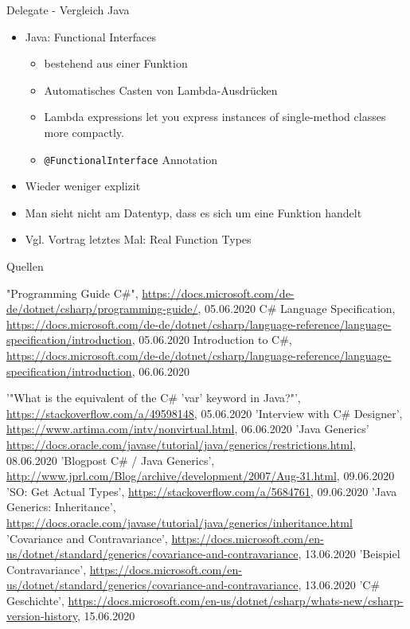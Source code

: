 \documentclass[11pt]{beamer}
\begin{document}
\begin{frame}{Delegate - Vergleich Java}
	\begin{itemize}
		\item Java: Functional Interfaces
		\begin{itemize}
			\item bestehend aus einer Funktion
			\item Automatisches Casten von Lambda-Ausdrücken
			\item \glqq Lambda expressions let you express instances of single-method classes more compactly.\grqq
			\item \texttt{@FunctionalInterface} Annotation		
		\end{itemize}
		\item Wieder weniger explizit
		\item Man sieht nicht am Datentyp, dass es sich um eine Funktion handelt
		\item Vgl. Vortrag letztes Mal: \glqq Real Function Types\grqq
	\end{itemize}
\end{frame}


\begin{frame}{Quellen}
\begin{thebibliography}{99}
\fontsize{6pt}{7.2}\selectfont
	"Programming Guide C\#", \url{https://docs.microsoft.com/de-de/dotnet/csharp/programming-guide/}, 05.06.2020
	 C\# Language Specification, \url{https://docs.microsoft.com/de-de/dotnet/csharp/language-reference/language-specification/introduction}, 05.06.2020
   Introduction to C\#, \url{https://docs.microsoft.com/de-de/dotnet/csharp/language-reference/language-specification/introduction}, 06.06.2020

 '"What is the equivalent of the C\# 'var' keyword in Java?"', 
 \url{https://stackoverflow.com/a/49598148}, 05.06.2020
 'Interview with C\# Designer', \url{https://www.artima.com/intv/nonvirtual.html}, 06.06.2020
  'Java Generics' \url{https://docs.oracle.com/javase/tutorial/java/generics/restrictions.html}, 08.06.2020
  'Blogpost C\# / Java Generics', \url{http://www.jprl.com/Blog/archive/development/2007/Aug-31.html}, 09.06.2020
  'SO: Get Actual Types', \url{https://stackoverflow.com/a/5684761}, 09.06.2020
  'Java Generics: Inheritance', \url{https://docs.oracle.com/javase/tutorial/java/generics/inheritance.html}
  'Covariance and Contravariance', \url{https://docs.microsoft.com/en-us/dotnet/standard/generics/covariance-and-contravariance}, 13.06.2020
  'Beispiel Contravariance', \url{https://docs.microsoft.com/en-us/dotnet/standard/generics/covariance-and-contravariance}, 13.06.2020
 'C\# Geschichte', \url{https://docs.microsoft.com/en-us/dotnet/csharp/whats-new/csharp-version-history}, 15.06.2020
\end{thebibliography}
\end{frame}
\end{document}

